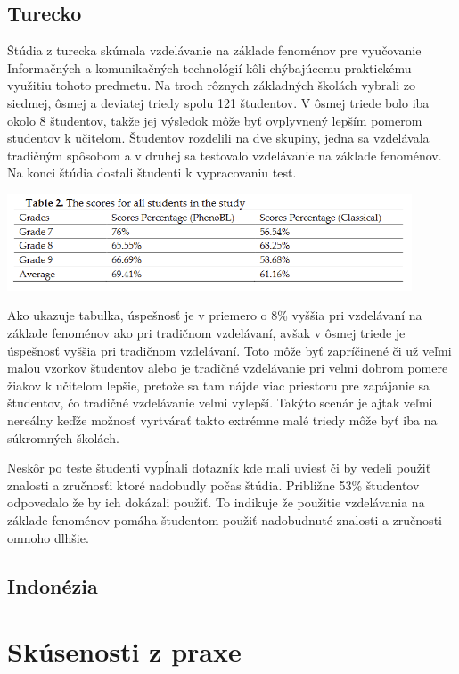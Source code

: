 \documentclass[10pt,slovak,a4paper]{article}
\begin{document}
\subsection{Turecko}

Štúdia z turecka \cite{jcer553507} skúmala vzdelávanie na základe fenoménov pre vyučovanie Informačných a komunikačných technológií
kôli chýbajúcemu praktickému využitiu tohoto predmetu. Na troch rôznych základných školách vybrali zo siedmej, ôsmej a deviatej
triedy spolu 121 študentov. V ôsmej triede bolo iba okolo 8 študentov, takže jej výsledok môže byť ovplyvnený lepším pomerom studentov
k učitelom. Študentov rozdelili na dve skupiny, jedna sa vzdelávala tradičným spôsobom a v druhej sa testovalo vzdelávanie na základe
fenoménov. Na konci štúdia dostali študenti k vypracovaniu test.

\includegraphics [width=0.9\textwidth] {table.png}

Ako ukazuje tabulka, úspešnosť je v priemero o 8\% vyššia pri vzdelávaní na základe fenoménov ako pri tradičnom vzdelávaní, avšak v 
ôsmej triede je úspešnosť vyššia pri tradičnom vzdelávaní. Toto môže byť zapríčinené či už veľmi malou vzorkov študentov alebo je
tradičné vzdelávanie pri velmi dobrom pomere žiakov k učitelom lepšie, pretože sa tam nájde viac priestoru pre zapájanie sa študentov,
čo tradičné vzdelávanie velmi vylepší. Takýto scenár je ajtak veľmi nereálny keďže možnosť vyrtvárať takto extrémne malé triedy môže byť iba
na súkromných školách.

Neskôr po teste študenti vypĺnali dotazník kde mali uviesť či by vedeli použiť znalosti a zručnosťi ktoré nadobudly počas štúdia. Približne 53\%
študentov odpovedalo že by ich dokázali použiť. To indikuje že použitie vzdelávania na základe fenoménov pomáha študentom použiť nadobudnuté 
znalosti a zručnosti omnoho dlhšie.

\subsection{Indonézia}

\cite{Santhalia_2020}

\section{Skúsenosti z praxe}
\end{document}
